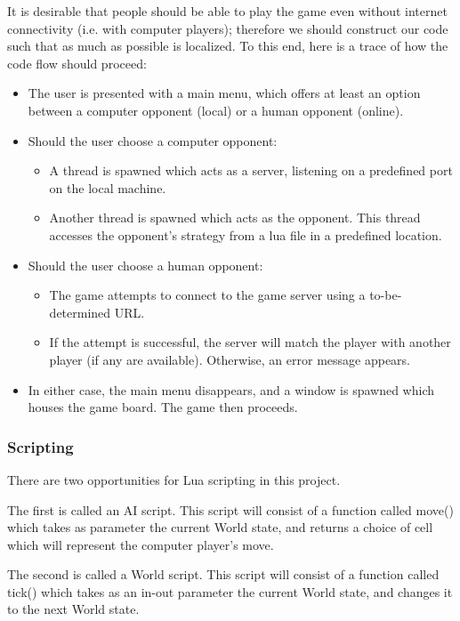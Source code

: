 \documentclass[letterpaper]{article}
\begin{document}
It is desirable that people should be able to play the game even without internet connectivity (i.e. with computer players); therefore we should construct our code such that as much as possible is localized. To this end, here is a trace of how the code flow should proceed:

\begin{itemize}
	\item The user is presented with a main menu, which offers at least an option between a computer opponent (local) or a human opponent (online).
	\item Should the user choose a computer opponent:
	\begin{itemize}
		\item A thread is spawned which acts as a server, listening on a predefined port on the local machine.
		\item Another thread is spawned which acts as the opponent. This thread accesses the opponent's strategy from a lua file in a predefined location.
	\end{itemize}
	\item Should the user choose a human opponent:
	\begin{itemize}
		\item The game attempts to connect to the game server using a to-be-determined URL.
		\item If the attempt is successful, the server will match the player with another player (if any are available). Otherwise, an error message appears.
	\end{itemize}
	\item In either case, the main menu disappears, and a window is spawned which houses the game board. The game then proceeds.
\end{itemize}

\subsubsection{Scripting}

There are two opportunities for Lua scripting in this project.

The first is called an AI script. This script will consist of a function called move() which takes as parameter the current World state, and returns a choice of cell which will represent the computer player's move.

The second is called a World script. This script will consist of a function called tick() which takes as an in-out parameter the current World state, and changes it to the next World state.
\end{document}
